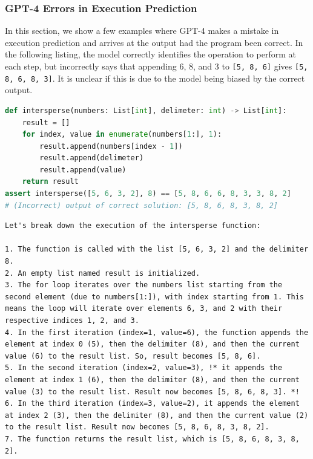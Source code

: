 \subsubsection{GPT-4 Errors in Execution Prediction} \label{appendix:gpt4-execution-errors}
In this section, we show a few examples where GPT-4 makes a mistake in execution prediction and arrives at the output had the program been correct. In the following listing, the model correctly identifies the operation to perform at each step, but incorrectly says that appending 6, 8, and 3 to \texttt{[5, 8, 6]} gives \texttt{[5, 8, 6, 8, 3]}. It is unclear if this is due to the model being biased by the correct output.
\newline
\begin{lstlisting}[language=Python, frame=single]
def intersperse(numbers: List[int], delimeter: int) -> List[int]:
    result = []
    for index, value in enumerate(numbers[1:], 1):
        result.append(numbers[index - 1])
        result.append(delimeter)
        result.append(value)
    return result
assert intersperse([5, 6, 3, 2], 8) == [5, 8, 6, 6, 8, 3, 3, 8, 2]
# (Incorrect) output of correct solution: [5, 8, 6, 8, 3, 8, 2]
\end{lstlisting}

\begin{lstlisting}[frame=single, belowskip=20pt]
Let's break down the execution of the intersperse function:

1. The function is called with the list [5, 6, 3, 2] and the delimiter 8.
2. An empty list named result is initialized.
3. The for loop iterates over the numbers list starting from the second element (due to numbers[1:]), with index starting from 1. This means the loop will iterate over elements 6, 3, and 2 with their respective indices 1, 2, and 3.
4. In the first iteration (index=1, value=6), the function appends the element at index 0 (5), then the delimiter (8), and then the current value (6) to the result list. So, result becomes [5, 8, 6].
5. In the second iteration (index=2, value=3), !* it appends the element at index 1 (6), then the delimiter (8), and then the current value (3) to the result list. Result now becomes [5, 8, 6, 8, 3]. *!
6. In the third iteration (index=3, value=2), it appends the element at index 2 (3), then the delimiter (8), and then the current value (2) to the result list. Result now becomes [5, 8, 6, 8, 3, 8, 2].
7. The function returns the result list, which is [5, 8, 6, 8, 3, 8, 2].
\end{lstlisting}

